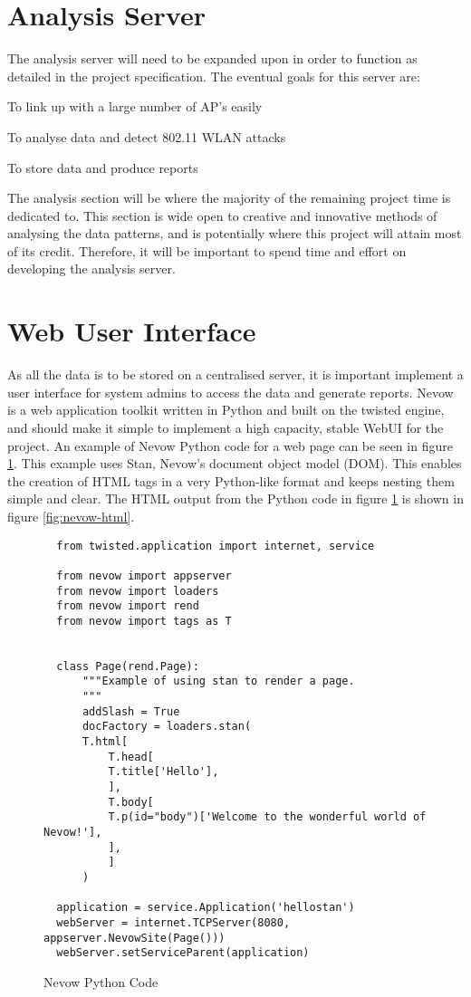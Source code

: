 \section{Analysis Server}

The analysis server will need to be expanded upon in order to function as detailed in the project specification. The eventual goals for this server are:

\begin{itemize*}
 \item To link up with a large number of AP's easily
 \item To analyse data and detect 802.11 WLAN attacks
 \item To store data and produce reports
\end{itemize*}

The analysis section will be where the majority of the remaining project time is dedicated to. This section is wide open to creative and innovative methods of analysing the data patterns, and is potentially where this project will attain most of its credit. Therefore, it will be important to spend time and effort on developing the analysis server. 

\section{Web User Interface}

As all the data is to be stored on a centralised server, it is important implement a user interface for system admins to access the data and generate reports. Nevow\cite{Divb} is a web application toolkit written in Python and built on the twisted engine, and should make it simple to implement a high capacity, stable WebUI for the project. An example of Nevow Python code for a web page can be seen in figure \ref{fig:nevow-python}. This example uses Stan, Nevow's document object model (DOM). This enables the creation of HTML tags in a very Python-like format and keeps nesting them simple and clear. The HTML output from the Python code in figure \ref{fig:nevow-python} is shown in figure \ref{fig:nevow-html}.
  
\begin{figure}[h!]
  \lstset{language=python}
  \begin{lstlisting}
  from twisted.application import internet, service

  from nevow import appserver
  from nevow import loaders
  from nevow import rend
  from nevow import tags as T


  class Page(rend.Page):
      """Example of using stan to render a page.
      """
      addSlash = True
      docFactory = loaders.stan(
	  T.html[
	      T.head[
		  T.title['Hello'],
		  ],
	      T.body[
		  T.p(id="body")['Welcome to the wonderful world of Nevow!'],
		  ],
	      ]
	  )

  application = service.Application('hellostan')
  webServer = internet.TCPServer(8080, appserver.NevowSite(Page()))
  webServer.setServiceParent(application)
  \end{lstlisting}
  \caption{Nevow Python Code\cite{Divb}}
  \label{fig:nevow-python}
\end{figure}

